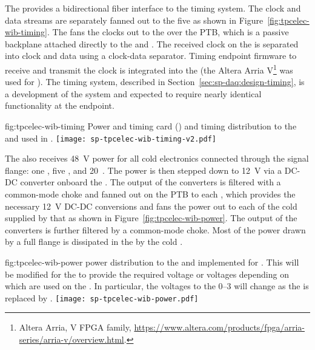 The   provides a bidirectional fiber interface to the
timing system. The clock and data
streams are separately fanned out to the five  as shown in
Figure~\ref{fig:tpcelec-wib-timing}. The  fans the clocks out to the  over the
PTB, which is a passive backplane attached directly to the  and
.  The received clock on the  is separated into clock and
data using a clock-data separator. Timing endpoint firmware to receive and transmit
the clock is integrated into the   (the Altera Arria V\footnote{Altera Arria\texttrademark{}, V FPGA family, \url{https://www.altera.com/products/fpga/arria-series/arria-v/overview.html}.} was used for ).
The  timing system, described in Section~\ref{sec:sp-daq:design-timing}, is a development of the  system and expected to require nearly identical functionality at the  endpoint.

\begin{dunefigure}
{fig:tpcelec-wib-timing}
{Power and timing card () and timing distribution to the  and  used in .}
\texttt{[image: sp-tpcelec-wib-timing-v2.pdf]}
\end{dunefigure}

The  also receives \SI{48}{V}  power for all cold
electronics connected through the  signal flange: one , five , and \num{20}~. The  power is then stepped down
to \SI{12}{V} via a DC-DC converter onboard the . The output of the  converters is filtered with a common-mode choke and fanned out
on the PTB to each , which provides the necessary \SI{12}{V} DC-DC conversions and fans
the  power out to each of the cold  supplied by that  
as shown in Figure~\ref{fig:tpcelec-wib-power}. The output of the  converters is further filtered by a common-mode choke. Most of the power drawn by a full flange is dissipated in the  by the cold .

\begin{dunefigure}
{fig:tpcelec-wib-power}
{ power distribution to the  and  implemented for . This will be modified for the  to provide the required voltage or voltages depending on which  are used on the . In particular, the voltages to the  \numrange{0}{3} will change as the   is replaced by . }
\texttt{[image: sp-tpcelec-wib-power.pdf]}
\end{dunefigure}

